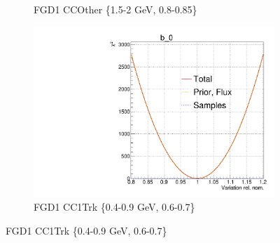 \begin{figure}[!h]
\begin{subfigure}[t]{0.32\textwidth}
		\caption{FGD1 CCOther \{1.5-2 GeV, 0.8-0.85\}}
	\end{subfigure}
	\begin{subfigure}[t]{0.32\textwidth}
		\includegraphics[width=\textwidth, trim={0mm 0mm 0mm 11mm}, clip,page=264]{figures/mach3/Asimov/Full_LLHscan_18July_BeRPA_U_ND280logL_scan}
		\caption{FGD1 \numubar CC1Trk \{0.4-0.9 GeV, 0.6-0.7\}}
	\end{subfigure}


\end{figure}
